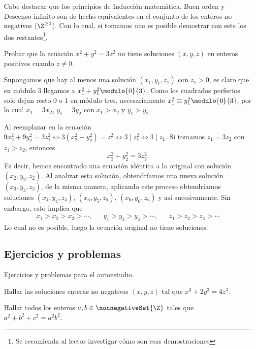 Cabe destacar que los principios de Inducción matemática, Buen orden y Descenso infinito son de hecho equivalentes en
el conjunto de los enteros no negativos ($\Z^{\geq 0}$).
Con lo cual, si tomamos uno es posible demostrar con este los dos restantes\footnote{Se recomienda al lector investigar cómo son esas demostraciones}.

\begin{example}
    Probar que la ecuación $x^2 + y^2 = 3z^2$ no tiene soluciones $(x,y,z)$ en enteros positivos cuando $z \neq 0$.
\end{example}
\begin{solution}
    Supongamos que hay al menos una solución $(x_1,y_1,z_1)$ con $z_1 > 0$, es claro que en módulo 3 llegamos a $x_1^2+y_1^2 \modulo{0}{3}$.
    Como los cuadrados perfectos solo dejan resto $0$ o $1$ en módulo tres, necesariamente $x_1^2\equiv y_1^2 \modulo{0}{3}$,
    por lo cual $x_1 = 3x_2$, $y_1 = 3y_2$ con $x_1 > x_2$ y $y_1 > y_2$.

    Al reemplazar en la ecuación $9x_2^2+9y_2^2=3z_1^2 \iff 3(x_2^2+y_2^2)=z_1^2 \iff 3 \mid z_1^2 \iff 3 \mid z_1$.
    Si tomamos $z_1 = 3z_2$ con $z_1 > z_2$, entonces
    \[
        x_2^2+y_2^2=3z_2^2.
    \]
    Es decir, hemos encontrado una ecuación idéntica a la original con solución $(x_2,y_2,z_2)$.
    Al analizar esta solución, obtendríamos una nueva solución $(x_3,y_3,z_3)$, de la misma manera, aplicando este proceso
    obtendríamos soluciones $(x_4,y_4,z_4)$, $(x_5,y_5,z_5)$, $(x_6,y_6,z_6)$ y así sucesivamente.
    Sin embargo, esto implica que
    \begin{align*}
        x_1 > x_2 > x_3 > \cdots, &&
        y_1 > y_2 > y_3 > \cdots, &&
        z_1 > z_2 > z_3 > \cdots
    \end{align*}
    Lo cual no es posible, luego la ecuación original no tiene soluciones.
\end{solution}




\subsection{Ejercicios y problemas}

Ejercicios y problemas para el autoestudio.

\begin{exercise}
    Hallar las soluciones enteras no negativas $(x,y,z)$ tal que $x^3 + 2y^3 = 4z^3$.
\end{exercise}

\begin{problem}
    Hallar todos los enteros $a,b \in \nonnegativeSet{\Z}$ tales que $a^2 + b^2 + c^2 = a^2 b^2$.
\end{problem}




